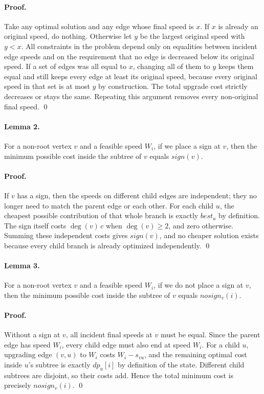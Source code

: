 \documentclass[11pt]{article}
\begin{document}
\paragraph{Proof.}
Take any optimal solution and any edge whose final speed is $x$.
If $x$ is already an original speed, do nothing.
Otherwise let $y$ be the largest original speed with $y < x$.
All constraints in the problem depend only on equalities between incident edge speeds and on the requirement that no
edge is decreased below its original speed.
If a set of edges was all equal to $x$, changing all of them to $y$ keeps them equal and still keeps every edge at
least its original speed, because every original speed in that set is at most $y$ by construction.
The total upgrade cost strictly decreases or stays the same.
Repeating this argument removes every non-original final speed. \qed

\paragraph{Lemma 2.}
For a non-root vertex $v$ and a feasible speed $W_i$, if we place a sign at $v$, then the minimum possible cost inside
the subtree of $v$ equals $sign(v)$.

\paragraph{Proof.}
If $v$ has a sign, then the speeds on different child edges are independent; they no longer need to match the parent
edge or each other.
For each child $u$, the cheapest possible contribution of that whole branch is exactly $best_u$ by definition.
The sign itself costs $\deg(v)\,c$ when $\deg(v)\ge 2$, and zero otherwise.
Summing these independent costs gives $sign(v)$, and no cheaper solution exists because every child branch is already
optimized independently. \qed

\paragraph{Lemma 3.}
For a non-root vertex $v$ and a feasible speed $W_i$, if we do not place a sign at $v$, then the minimum possible cost
inside the subtree of $v$ equals $nosign_v(i)$.

\paragraph{Proof.}
Without a sign at $v$, all incident final speeds at $v$ must be equal.
Since the parent edge has speed $W_i$, every child edge must also end at speed $W_i$.
For a child $u$, upgrading edge $(v,u)$ to $W_i$ costs $W_i - s_{vu}$, and the remaining optimal cost inside $u$'s
subtree is exactly $dp_u[i]$ by definition of the state.
Different child subtrees are disjoint, so their costs add.
Hence the total minimum cost is precisely $nosign_v(i)$. \qed
\end{document}
